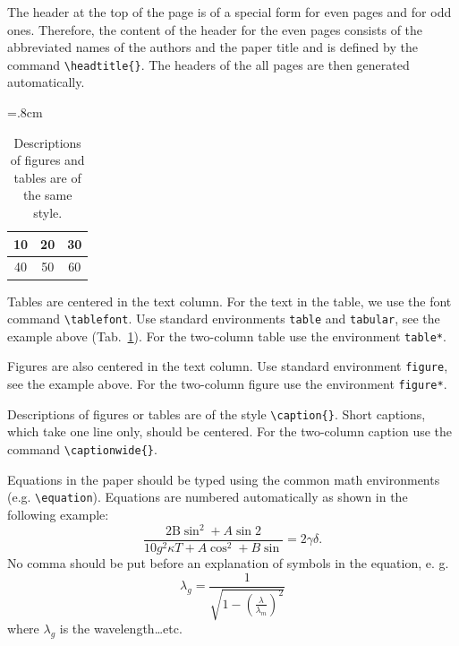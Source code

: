 \documentclass{poster16}
\begin{document}
The header at the top of the page is of a special form for even pages and for odd ones. Therefore, the content of the header for the even pages consists of the abbreviated names of the authors and the paper title and is defined by the command \verb+\headtitle{}+. The headers of the all pages are then generated automatically.

%
\begin{table}[h]
\begin{center}
{\renewcommand{\arraystretch}{1.4}
\tabcolsep=.8cm
\tablefont
\begin{tabular}{|c|c|c|}
\hline
10
&20
&30\\
\hline
40
&50
&60\\
\hline
\end{tabular}}
\caption{Descriptions of figures and tables are of the same style.}
\label{tab}
\end{center}
\end{table}
Tables are centered in the text column. For the text in the table, we use the font command \verb+\tablefont+. Use standard environments \verb+table+ and \verb+tabular+, see the example above (Tab.~\ref{tab}). For the two-column table use the environment \verb+table*+. 

Figures are also centered in the text column. Use standard environment \verb+figure+, see the example above. For the two-column figure use the environment \verb+figure*+. 

Descriptions of figures or tables are of the style \verb+\caption{}+. Short captions, which take one line only, should be centered. For the two-column caption use the command \verb+\captionwide{}+.

Equations in the paper should be typed using the common math  environments (e.g. \verb+\equation+). Equations are numbered automatically as shown in the following example:
\begin{equation}
\frac{2\mathrm{B} \sin^2 + A \sin2}{10 g^2 \kappa T + A \cos^2 + B \sin}= 2 \gamma\delta .
\end{equation}
No comma should be put before an explanation of symbols in the equation, e. g. 
\begin{equation}
       \lambda_g =\frac{1}{\sqrt{1-\left(\frac{\lambda}{\lambda_m}\right)^2}}
\end{equation}	
where $\lambda_g$ is the wavelength\dots etc.
\end{document}
